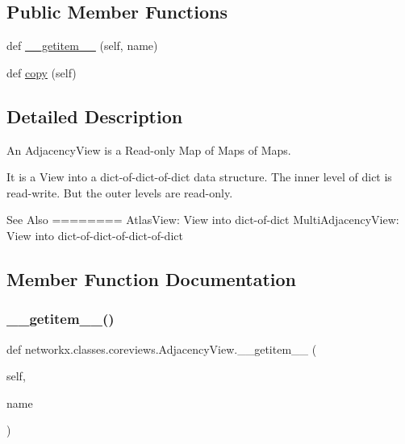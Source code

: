 \subsection*{Public Member Functions}
\begin{DoxyCompactItemize}
\item 
def \hyperlink{classnetworkx_1_1classes_1_1coreviews_1_1AdjacencyView_afc0133cdcf0f1bd4336452e8bcd9b338}{\+\_\+\+\_\+getitem\+\_\+\+\_\+} (self, name)
\item 
def \hyperlink{classnetworkx_1_1classes_1_1coreviews_1_1AdjacencyView_a105d9fb30969b1ee9ac75679f50ea352}{copy} (self)
\end{DoxyCompactItemize}


\subsection{Detailed Description}
\begin{DoxyVerb}An AdjacencyView is a Read-only Map of Maps of Maps.

It is a View into a dict-of-dict-of-dict data structure.
The inner level of dict is read-write. But the
outer levels are read-only.

See Also
========
AtlasView: View into dict-of-dict
MultiAdjacencyView: View into dict-of-dict-of-dict-of-dict
\end{DoxyVerb}
 

\subsection{Member Function Documentation}
\mbox{\label{classnetworkx_1_1classes_1_1coreviews_1_1AdjacencyView_afc0133cdcf0f1bd4336452e8bcd9b338}} 
\subsubsection{\texorpdfstring{\+\_\+\+\_\+getitem\+\_\+\+\_\+()}{\_\_getitem\_\_()}}
{\footnotesize\ttfamily def networkx.\+classes.\+coreviews.\+Adjacency\+View.\+\_\+\+\_\+getitem\+\_\+\+\_\+ (\begin{DoxyParamCaption}\item[{}]{self,  }\item[{}]{name }\end{DoxyParamCaption})}

